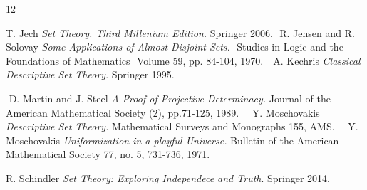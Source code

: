 \documentclass[a4paper,11pt]{article}
\begin{document}
\begin{thebibliography}{12}
     

   

   
   
     T. Jech \textit{Set Theory. Third Millenium Edition.} Springer 2006.
    ﻿
    ﻿
    ﻿
    R. Jensen and R. Solovay \textit{Some Applications of Almost Disjoint Sets.}
    ﻿
    Studies in Logic and the Foundations of Mathematics
    ﻿
    Volume 59, pp. 84-104, 1970.
    ﻿
    ﻿
A. Kechris 
\textit{Classical Descriptive Set Theory}.  
Springer 1995.
    ﻿
    ﻿
    ﻿
   
     
    ﻿
      D. Martin and J. Steel \textit{A Proof of Projective Determinacy.} Journal of the American Mathematical Society (2), pp.71-125, 1989.
    ﻿
    ﻿
    ﻿
    Y. Moschovakis \textit{Descriptive Set Theory.} Mathematical Surveys and Monographs 155, AMS.
    ﻿
    ﻿
    ﻿
    Y. Moschovakis \textit{Uniformization in a playful Universe.}  Bulletin of the  American Mathematical Society 77, no. 5, 731-736, 1971.


   R. Schindler \textit{Set Theory: Exploring Independece and Truth}. Springer 2014.
    \end{thebibliography}
    ﻿
    
\end{document}
